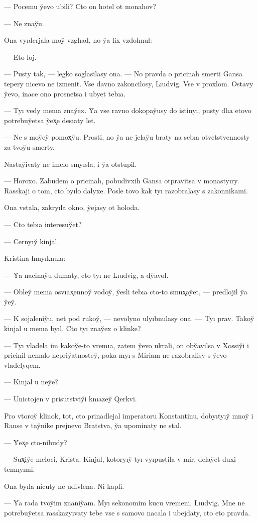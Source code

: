 \documentclass[10pt]{book}
\begin{document}
— Pocemu y̆evo ubili? Cto on hotel ot monahov?

— Ne znay̆u.

Ona vyıderjala moy̆ vzglıad, no y̆a lix vzdohnul:

— Eto loj.

— Pusty tak, — legko soglasilasy ona. — No pravda o pricinah smerti Gansa tepery nicevo ne izmenit. Vse davno zakoncilosy, Lıudvig. Vse v proxlom. Ostavy y̆evo, inace ono prosnetsa i ubyet tebıa.

— Tyı vedy menıa znay̆ex. Y̆a vse ravno dokopay̆usy do istinyı, pusty dlıa etovo potrebuy̆etsa y̆ex̨e desıaty let.

— Ne s moy̆ey̆ pomox̨y̆u. Prosti, no y̆a ne jelay̆u braty na sebıa otvetstvennosty za tvoy̆u smerty.

Nastay̆ivaty ne imelo smyısla, i y̆a otstupil.

— Horoxo. Zabudem o pricinah, pobudivxih Gansa otpravitsa v monastyıry. Rasskaji o tom, cto byılo dalyxe. Posle tovo kak tyı razobralasy s zakonnikami.

Ona vstala, zakryıla okno, y̆ejasy ot holoda.

— Cto tebıa interesuy̆et?

— Cernyıy̆ kinjal.

Kristina hmyıknula:

— Y̆a nacinay̆u dumaty, cto tyı ne Lıudvig, a dy̆avol.

— Obley̆ menıa osvıax̨ennoy̆ vodoy̆, y̆esli tebıa cto-to smux̨ay̆et, — predlojil y̆a y̆ey̆.

— K sojaleniy̆u, net pod rukoy̆, — nevolyno ulyıbnulasy ona. — Tyı prav. Takoy̆ kinjal u menıa byıl. Cto tyı znay̆ex o klinke?

— Tyı vladela im kakoy̆e-to vremıa, zatem y̆evo ukrali, on oby̆avilsa v Xossiy̆i i pricinil nemalo nepriy̆atnostey̆, poka myı s Miriam ne razobralisy s y̆evo vladelyqem.

— Kinjal u ney̆e?

— Unictojen v prisutstviy̆i knıazey̆ Qerkvi.

Pro vtoroy̆ klinok, tot, cto prinadlejal imperatoru Konstantinu, dobyıtyıy̆ mnoy̆ i Ranse v tay̆nike prejnevo Bratstva, y̆a upominaty ne stal.

— Y̆ex̨e cto-nibudy?

— Sux̨iy̆e meloci, Krista. Kinjal, kotoryıy̆ tyı vyıpustila v mir, delay̆et duxi temnyımi.

Ona byıla nicuty ne udivlena. Ni kapli.

— Y̆a rada tvoy̆im znaniy̆am. Myı sekonomim kucu vremeni, Lıudvig. Mne ne potrebuy̆etsa rasskazyıvaty tebe vse s samovo nacala i ubejdaty, cto eto pravda.
\end{document}
